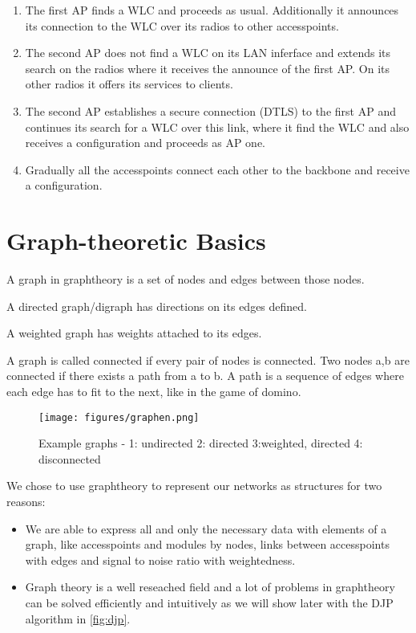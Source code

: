 	\begin{enumerate}
	  \item The first \ac{AP} finds a WLC and proceeds as usual. Additionally it announces its connection to the WLC over its radios to other accesspoints.
	  
	  \item The second \ac{AP} does not find a \ac{WLC} on its LAN inferface and extends its search on the radios where it receives the announce of the first \ac{AP}.
	    On its other radios it offers its services to clients.
	    
	  \item The second \ac{AP} establishes a secure connection (\ac{DTLS}) to the first \ac{AP} and continues its search for a \ac{WLC} over this link, 
	    where it find the \ac{WLC} and also receives a configuration and proceeds as \ac{AP} one.
	    
	  \item Gradually all the accesspoints connect each other to the backbone and receive a configuration.
	\end{enumerate}
	
\section{Graph-theoretic Basics}
  A graph in graphtheory is a set of nodes and edges between those nodes. 
  
  A directed graph/digraph has directions on its edges defined.
  
  A weighted graph has weights attached to its edges.
  
  A graph is called connected if every pair of nodes is connected. 
  Two nodes a,b are connected if there exists a path from a to b.
  A path is a sequence of edges where each edge has to fit to the next, like in the game of domino.
  
  \begin{figure}[th!]
    \centering
    \texttt{[image: figures/graphen.png]}
    \caption{Example graphs - 1: undirected 2: directed 3:weighted, directed 4: disconnected}
    \label{fig:graphen}
  \end{figure}

  We chose to use graphtheory to represent our networks as structures for two reasons:
  \begin{itemize}
   \item We are able to express all and only the necessary data with elements of a graph, like
    accesspoints and modules by nodes, links between accesspoints with edges and signal to noise ratio with weightedness. 
    
   \item Graph theory is a well reseached field and a lot of problems in graphtheory can be solved efficiently and intuitively 
    as we will show later with the \ac{DJP} algorithm in \ref{fig:djp}.
  \end{itemize}
    
